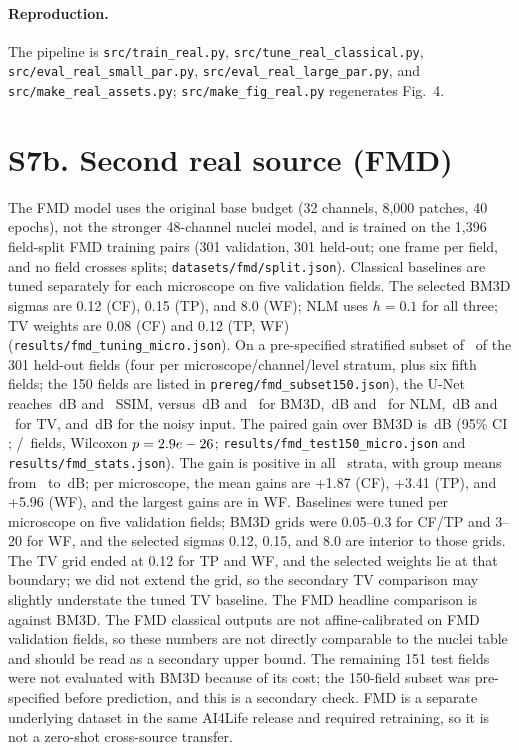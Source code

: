 \documentclass[11pt]{article}
\begin{document}
{\raggedright
\paragraph{Reproduction.} The pipeline is \texttt{src/train\_real.py},
\texttt{src/tune\_real\_classical.py}, \texttt{src/eval\_real\_small\_par.py},
\texttt{src/eval\_real\_large\_par.py}, and \texttt{src/make\_real\_assets.py};
\texttt{src/make\_fig\_real.py} regenerates Fig.~4.\par}

\section*{S7b. Second real source (FMD)}
The FMD model uses the original base budget (32 channels, 8{,}000 patches,
40 epochs), not the stronger 48-channel nuclei model, and is trained on the
1{,}396 field-split FMD
training pairs (301 validation, 301 held-out; one frame per field, and no field
crosses splits; \texttt{datasets/fmd/split.json}). Classical baselines are
tuned separately for each microscope on five validation fields. The selected
BM3D sigmas are 0.12 (CF), 0.15 (TP), and 8.0 (WF); NLM uses $h=0.1$ for all
three; TV weights are 0.08 (CF) and 0.12 (TP, WF)
(\texttt{results/fmd\_tuning\_micro.json}). On a pre-specified stratified subset
of \FmdN\ of the 301 held-out fields (four per microscope/channel/level
stratum, plus six fifth fields; the 150 fields are listed in
\texttt{prereg/fmd\_subset150.json}), the U-Net reaches \FmdUnetP\,dB and
\FmdUnetS\ SSIM, versus \FmdBMThreeP\,dB and
\FmdBMThreeS\ for BM3D, \FmdNlmP\,dB and \FmdNlmS\ for NLM, \FmdTvP\,dB and
\FmdTvS\ for TV, and \FmdNoisyP\,dB for the noisy input. The paired gain over
BM3D is \FmdGain\,dB (95\% CI \FmdCI; \FmdWins/\FmdN\ fields, Wilcoxon
$p=2.9e-26$; \texttt{results/fmd\_test150\_micro.json} and
\texttt{results/fmd\_stats.json}). The gain is positive in all \FmdStrataN\
strata, with group means from \FmdStrataMin\ to \FmdStrataMax\,dB; per
microscope, the mean gains are +1.87 (CF), +3.41 (TP), and +5.96 (WF), and the
largest gains are in WF. Baselines were tuned per microscope on five validation
fields; BM3D grids were 0.05--0.3 for CF/TP and 3--20 for WF, and the selected
sigmas 0.12, 0.15, and 8.0 are interior to those grids. The TV grid ended at
0.12 for TP and WF, and the selected weights lie at that boundary; we did not
extend the grid, so the secondary TV comparison may slightly understate the
tuned TV baseline. The FMD headline comparison is against BM3D. The FMD classical outputs are not affine-calibrated on FMD
validation fields, so these numbers are not directly comparable to the nuclei
table and should be read as a secondary upper
bound. The remaining 151 test fields were not evaluated with BM3D because of
its cost; the 150-field subset was pre-specified before prediction, and this is
a secondary check. FMD is a separate underlying dataset in the same AI4Life
release and required
retraining, so it is not a zero-shot cross-source transfer.
\end{document}
